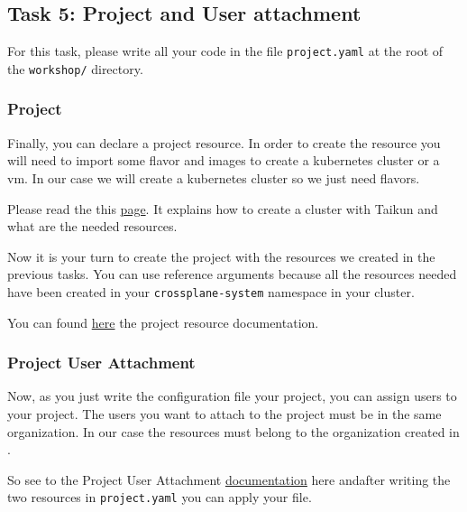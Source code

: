 \subsection{Task 5: Project and User attachment}\label{sec:project}

\begin{note}
For this task, please write all your code in the file \texttt{project.yaml}
at the root of the \texttt{workshop/} directory.
\end{note}

\subsubsection{Project}

Finally, you can declare a project resource.
In order to create the resource you will need to import some flavor and images to 
create a kubernetes cluster or a vm.
In our case we will create a kubernetes cluster so we just need flavors.

\begin{tip}
Please read the this \href{https://itera.gitbook.io/taikun/guidelines/creating-a-cluster}{page}.
It explains how to create a cluster with Taikun and what are the needed resources.
\end{tip}


Now it is your turn to create the project with the resources we created in 
the previous tasks.
You can use reference arguments because all the resources needed have been created in your 
\texttt{crossplane-system} namespace in your cluster.

You can found \href{https://github.com/itera-io/provider-jet-taikun/blob/main/docs/project.taikun.jet.crossplane.io.md}{here}
 the project resource documentation.

\subsubsection{Project User Attachment}

Now, as you just write the configuration file your project, you can assign
 users to your project.
The users you want to attach to the project must be in the same organization.
 In our case the 
resources must belong to the organization created in .

So see to the Project User Attachment \href{https://github.com/itera-io/provider-jet-taikun/blob/main/docs/projectuserattachment.taikun.jet.crossplane.io.md}{documentation} 
here andafter writing the two resources in \texttt{project.yaml} you can apply 
your file.


